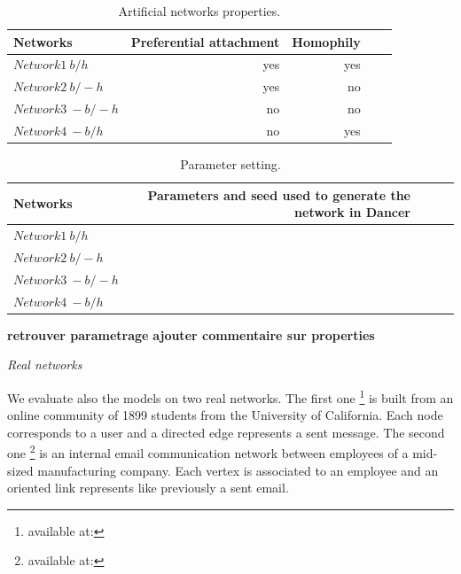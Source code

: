 \begin{table} \label{table:artificial_networks}
    \caption{Artificial networks properties.}
\begin{tabular}{lrrrr}
\hline                                                                             
 Networks   &  Preferential attachment    &  Homophily    \\                 
\hline                                                                             
$Network1~b/h$ & yes&yes  \\
$Network2~b/-h$  & yes&no   \\
$Network3~-b/-h$ &no &no   \\
$Network4~-b/h$ &no &yes  \\
\hline                                                                             
\end{tabular}  
\end{table}


\begin{table} \label{table:generatorparameter}
    \caption{Parameter setting.}
\begin{tabular}{lrrrr}
\hline                                                                             
 Networks   &  Parameters and seed used to generate the network in Dancer    \\                 
\hline                                                                             
$Network1~b/h$ &    \\
$Network2~b/-h$  &  \\
$Network3~-b/-h$ &   \\
$Network4~-b/h$ &  \\
\hline                                                                             
\end{tabular}  
\end{table}

 \textbf{retrouver parametrage}
 \textbf{ajouter commentaire sur properties}

\textit{Real networks}

We evaluate also the models on two  real networks.
The first one \footnote{available at:} is built from an online community of 1899 students from the University of California. Each node corresponds to a user and a directed edge represents a sent message. 
The second one \footnote{available at:} is an internal email communication network between employees of a mid-sized manufacturing company. Each vertex is associated to an employee and an oriented link represents like previously a sent email.

